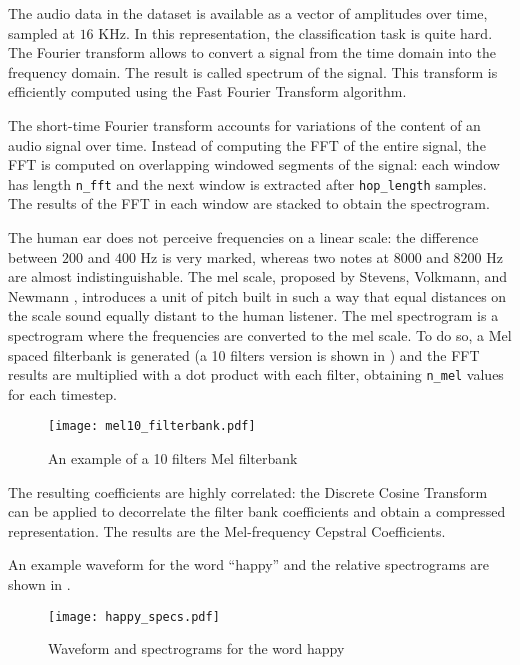 The audio data in the dataset is available as a vector of amplitudes over time,
sampled at $16$ KHz. In this representation, the classification task is quite
hard.
The Fourier transform allows to convert a signal from the time domain into the
frequency domain. The result is called spectrum of the signal. This transform
is efficiently computed using the Fast Fourier Transform algorithm.

The short-time Fourier transform accounts for variations of the content of an
audio signal over time. Instead of computing the FFT of the entire signal, the
FFT is computed on overlapping windowed segments of the signal: each window has
length \texttt{n_fft} and the next window is extracted after
\texttt{hop_length} samples.
The results of the FFT in each window are stacked to obtain the spectrogram.

The human ear does not perceive frequencies on a linear scale: the difference
between $200$ and $400$ Hz is very marked, whereas two notes at $8000$ and
$8200$ Hz are almost indistinguishable. The mel scale, proposed by Stevens,
Volkmann, and Newmann \cite{melscale1937}, introduces a unit of pitch built in
such a way that equal distances on the scale sound equally distant to the human
listener.
The mel spectrogram is a spectrogram where the frequencies are converted to the
mel scale. To do so, a Mel spaced filterbank is generated (a 10 filters version
is shown in ) and the FFT results are multiplied with
a dot product with each filter, obtaining \texttt{n_mel} values for each
timestep.

\begin{figure}[t!]
    \centering
    \texttt{[image: mel10\_filterbank.pdf]}
    \caption{An example of a 10 filters Mel filterbank}
    \label{fig:mel10_filterbank}
\end{figure}

The resulting coefficients are highly correlated: the Discrete Cosine Transform
can be applied to decorrelate the filter bank coefficients and obtain a
compressed representation.
The results are the Mel-frequency Cepstral Coefficients.

An example waveform for the word ``happy'' and the relative spectrograms are
shown in .

\begin{figure}[t!]
    \centering
    \texttt{[image: happy\_specs.pdf]}
    \caption{Waveform and spectrograms for the word happy}%
    \label{fig:happy_specs}
\end{figure}

